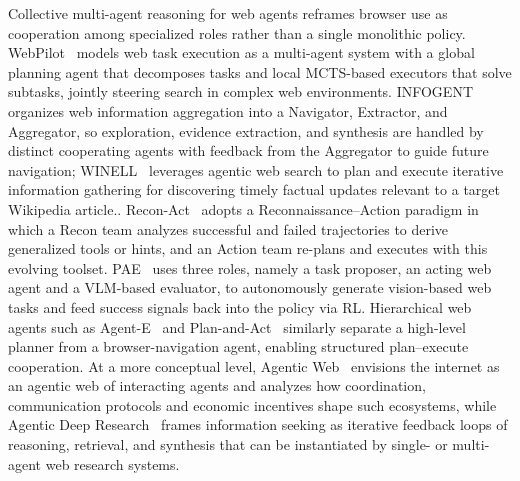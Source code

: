 Collective multi-agent reasoning for web agents reframes browser use as cooperation among specialized roles rather than a single monolithic policy. WebPilot~\cite{zhang2025webpilot} models web task execution as a multi-agent system with a global planning agent that decomposes tasks and local MCTS-based executors that solve subtasks, jointly steering search in complex web environments. INFOGENT~\cite{reddy2025infogent} organizes web information aggregation into a Navigator, Extractor, and Aggregator, so exploration, evidence extraction, and synthesis are handled by distinct cooperating agents with feedback from the Aggregator to guide future navigation; WINELL~\cite{reddy2025winell} leverages agentic web search to plan and execute iterative information gathering for discovering timely factual updates relevant to a target Wikipedia article.. Recon-Act~\cite{he2025recon} adopts a Reconnaissance–Action paradigm in which a Recon team analyzes successful and failed trajectories to derive generalized tools or hints, and an Action team re-plans and executes with this evolving toolset. PAE~\cite{zhou2025proposer} uses three roles, namely a task proposer, an acting web agent and a VLM-based evaluator, to autonomously generate vision-based web tasks and feed success signals back into the policy via RL. Hierarchical web agents such as Agent-E~\cite{abuelsaad2024agent} and Plan-and-Act~\cite{wang2023plan} similarly separate a high-level planner from a browser-navigation agent, enabling structured plan–execute cooperation. At a more conceptual level, Agentic Web~\cite{yang2025agentic} envisions the internet as an agentic web of interacting agents and analyzes how coordination, communication protocols and economic incentives shape such ecosystems, while Agentic Deep Research~\cite{weizhi2025from} frames information seeking as iterative feedback loops of reasoning, retrieval, and synthesis that can be instantiated by single- or multi-agent web research systems.



